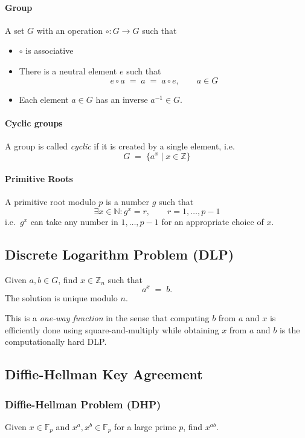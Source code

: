 \documentclass[a4paper]{scrartcl}
\newcommand\N{\mathbb N}
\newcommand\Z{\mathbb Z}
\newcommand\F{\mathbb F}
\begin{document}
\paragraph{Group} A set $G$ with an operation $\circ:G\rightarrow G$ such that
\begin{itemize}
    \item $\circ$ is associative
    \item There is a neutral element $e$ such that \[e\circ a\;=\;a\;=\;a\circ e,\qquad a\in G\]
    \item Each element $a\in G$ has an inverse $a^{-1}\in G$.
\end{itemize}

\paragraph{Cyclic groups} A group is called \textit{cyclic} if it is created by a single element, i.e. \[G\;=\;\{a^x\mid x\in\Z\}\]

\paragraph{Primitive Roots} A primitive root modulo $p$ is a number $g$ such that
\[\exists x\in\N:g^x=r,\qquad r=1,\hdots,p-1\]
i.e.\ $g^x$ can take any number in $1,\hdots,p-1$ for an appropriate choice of $x$.

\subsection{Discrete Logarithm Problem (DLP)}
Given $a,b\in G$, find $x\in\Z_n$ such that \[a^x\;=\;b.\] The solution is unique modulo $n$.

\smallskip This is a \textit{one-way function} in the sense that computing $b$ from $a$ and $x$ is efficiently done using square-and-multiply while obtaining $x$ from $a$ and $b$ is the computationally hard DLP.

\subsection{Diffie-Hellman Key Agreement}

\subsubsection{Diffie-Hellman Problem (DHP)}

Given $x\in \F_p$ and $x^a,x^b\in \F_p$ for a large prime $p$, find $x^{ab}$.
\end{document}
